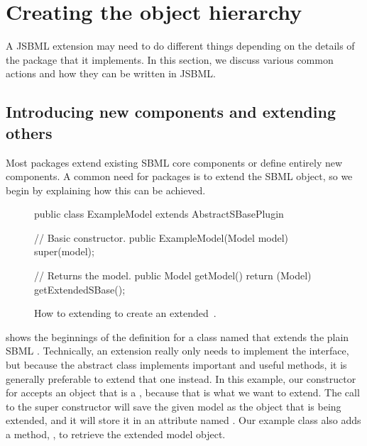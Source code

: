 
\section{Creating the object hierarchy}
\label{sec:creating-obj-hierarchy}

A JSBML extension may need to do different things depending on the details
of the \SBMLthree package that it implements.  In this section, we discuss
various common actions and how they can be written in JSBML.


\subsection{Introducing new components and extending others}
\label{subsec:addingClasses}

Most \SBMLthree packages extend existing SBML core components or define
entirely new components.  A common need for packages is to extend the SBML
\Model object, so we begin by explaining how this can be achieved.

\begin{figure}[t]
  \begin{example}[numbers=left]
public class ExampleModel extends AbstractSBasePlugin {

  // Basic constructor.
  public ExampleModel(Model model) {
    super(model);
  }

  // Returns the model.
  public Model getModel() {
    return (Model) getExtendedSBase();
  }
}\end{example}
  \caption{How to extending \AbstractSBasePlugin to create an extended
    \,\Model.}
  \label{lst:ModelExtClass}
\end{figure}

 shows the beginnings of the definition for
a class named  that extends the plain SBML
\Model. Technically, an extension really only needs to implement the
\SBasePlugin interface, but because the abstract class \AbstractSBasePlugin
implements important and useful methods, it is generally preferable to
extend that one instead.  In this example, our constructor for
 accepts an object that is a \Model, because that is
what we want to extend.  The call to the super constructor will save the
given model as the \SBase object that is being extended, and it will store
it in an attribute named . Our example
 class also adds a method, , to
retrieve the extended model object.

